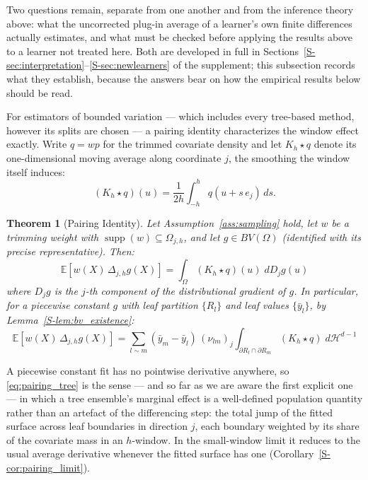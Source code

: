 \documentclass[12pt,a4paper]{article}
\numberwithin{equation}{section}
\theoremstyle{plain}
\newtheorem{theorem}{Theorem}
\theoremstyle{definition}
\newcommand{\E}{\mathbb{E}}
\newcommand{\BV}{BV(\Omega)}
\newcommand{\Dh}{\Delta_{j,h}}
\begin{document}
	Two questions remain, separate from one another and from the inference
	theory above: what the uncorrected plug-in average of a learner's own finite
	differences actually estimates, and what must be checked before applying the
	results above to a learner not treated here. Both are developed in full in
	Sections~\ref{S-sec:interpretation}--\ref{S-sec:newlearners} of the
	supplement; this subsection records what they establish, because the answers
	bear on how the empirical results below should be read.

	For estimators of bounded variation --- which includes every tree-based
	method, however its splits are chosen --- a pairing identity characterizes
	the window effect exactly. Write $q = wp$ for the trimmed covariate density
	and let $K_h \star q$ denote its one-dimensional moving average along
	coordinate $j$, the smoothing the window itself induces:
	\begin{equation}
		(K_h \star q)(u) = \frac{1}{2h} \int_{-h}^{h} q(u + s\, e_j)\, ds .
		\label{eq:movingaverage}
	\end{equation}

	\begin{theorem}[Pairing Identity]
		\label{thm:pairing}
		Let Assumption~\ref{ass:sampling} hold, let $w$ be a trimming weight with
		$\operatorname{supp}(w) \subseteq \Omega_{j,h}$, and let $g \in \BV$
		(identified with its precise representative). Then:
		\begin{equation}
			\E\left[w(X)\, \Dh g(X)\right]
			= \int_\Omega (K_h \star q)(u)\; dD_j g(u)
			\label{eq:pairing}
		\end{equation}
		where $D_j g$ is the $j$-th component of the distributional gradient of $g$.
		In particular, for a piecewise constant $g$ with leaf partition $\{R_l\}$ and
		leaf values $\{\bar{y}_l\}$, by Lemma~\ref{S-lem:bv_existence}:
		\begin{equation}
			\E\left[w(X)\, \Dh g(X)\right]
			= \sum_{l \sim m} (\bar{y}_m - \bar{y}_l)\, (\nu_{lm})_j
			\int_{\partial R_l \cap \partial R_m} (K_h \star q)\;
			d\mathcal{H}^{d-1}
			\label{eq:pairing_tree}
		\end{equation}
	\end{theorem}

	A piecewise constant fit has no pointwise derivative anywhere, so
	\eqref{eq:pairing_tree} is the sense --- and so far as we are aware the
	first explicit one --- in which a tree ensemble's marginal effect is a
	well-defined population quantity rather than an artefact of the differencing
	step: the total jump of the fitted surface across leaf boundaries in
	direction $j$, each boundary weighted by its share of the covariate mass in
	an $h$-window. In the small-window limit it reduces to the usual average
	derivative whenever the fitted surface has one
	(Corollary~\ref{S-cor:pairing_limit}).
\end{document}
